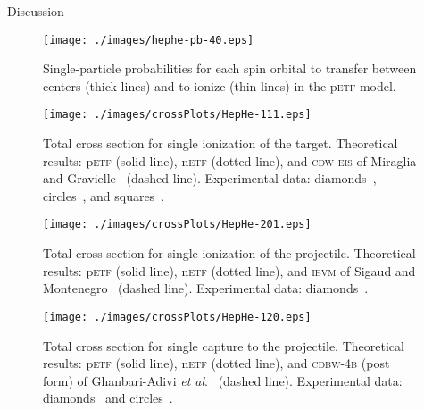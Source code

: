 \documentclass[aps, pra, reprint, groupedaddress, amsfonts, longbibliography,
               amsmath, amssymb, showpacs, nofootinbib]{revtex4-1}
\begin{document}
\begin{section}{Discussion \label{sec:disc}}

   \begin{figure}[t]
      \centering
      \texttt{[image: ./images/hephe-pb-40.eps]}
      \caption{Single-particle probabilities for each spin orbital to transfer between
               centers (thick lines) and to ionize (thin lines) in the p\textsc{etf} model.
               \label{fig:pbPlot}}
   \end{figure}

   \begin{figure}[t]
      \centering
      \texttt{[image: ./images/crossPlots/HepHe-111.eps]}
      \caption{Total cross section for single ionization of the target.
               Theoretical results: p\textsc{etf} (solid line), n\textsc{etf} (dotted line), and
                                    \textsc{cdw-eis} of Miraglia and Gravielle~\cite{MG-10}
                                    (dashed line).
               Experimental data: diamonds~\cite{Dub-89}, circles~\cite{FTFHLP-95}, and
                                  squares~\cite{DT-88}. \label{fig:cs111}}
   \end{figure}

   \begin{figure}[t]
      \centering
      \texttt{[image: ./images/crossPlots/HepHe-201.eps]}
      \caption{Total cross section for single ionization of the projectile.
               Theoretical results: p\textsc{etf} (solid line), n\textsc{etf} (dotted line), and
                                    \textsc{ievm} of Sigaud and Montenegro~\cite{SM-03} (dashed line).
               Experimental data: diamonds~\cite{Dub-89}. \label{fig:cs201}}
   \end{figure}

   \begin{figure}[t]
      \centering
      \texttt{[image: ./images/crossPlots/HepHe-120.eps]}
      \caption{Total cross section for single capture to the projectile.
               Theoretical results: p\textsc{etf} (solid line), n\textsc{etf} (dotted line), and
                                    \textsc{cdbw-4b} (post form) of Ghanbari-Adivi
                                    \textit{et al}.~\cite{GAG15} (dashed line).
               Experimental data: diamonds~\cite{Dub-89} and circles~\cite{FTFHLP-95}. \label{fig:cs120}}
   \end{figure}


\end{section}
\end{document}

